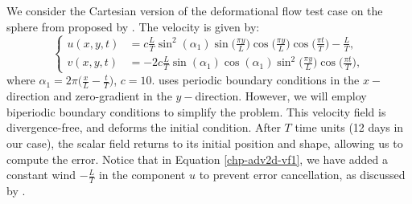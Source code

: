 We consider the Cartesian version of the deformational flow test case on the sphere from \citet{nair:2010}
proposed by \citet{chen:2017}. The velocity is given by:
\begin{equation}
	\label{chp-adv2d-vf1}
	\begin{cases}
		u(x,y,t) &= c\frac{L}{T}  \sin^2(\alpha_1)\sin\big(\frac{\pi y}{L}\big)\cos\big(\frac{\pi y}{L}\big)  \cos\big(\frac{\pi t}{T}\big) - \frac{L}{T},\\
		v(x,y,t) &= -2c\frac{L}{T}\sin(\alpha_1)  \cos(\alpha_1)\sin^2\big(\frac{\pi y}{L}\big)\cos\big(\frac{\pi t}{T}\big),
	\end{cases}
\end{equation}
where $\alpha_1 = 2\pi\big(\frac{x}{L}-\frac{t}{T}\big)$, $c = 10$.
\citet{chen:2017} uses periodic boundary conditions in the $x-$direction and zero-gradient in the $y-$direction.
However, we will employ biperiodic boundary conditions to simplify the problem.
This velocity field is divergence-free, and deforms the initial condition.
After $T$ time units (12 days in our case), the scalar field returns to its initial position and shape, allowing us to compute the error.
Notice that in Equation \eqref{chp-adv2d-vf1}, we have added a constant wind $-\frac{L}{T}$ in the component
$u$ to prevent error cancellation, as discussed by \citet{nair:2010}.
